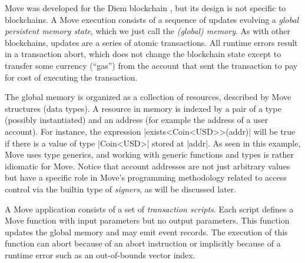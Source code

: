 

Move was developed for the Diem blockchain \cite{DIEM}, but its design is not
specific to blockchains.  A Move execution consists of a sequence of updates
evolving a \emph{global persistent memory state}, which we just call the
\emph{(global) memory}.
As with other blockchains, updates are a series of atomic transactions.
All runtime errors result in a transaction abort, which does not change
the blockchain state except to transfer some currency (``gas'') from the account that
sent the transaction to pay for cost of executing the transaction.

The global memory is organized as a collection of resources, described by Move
structures (data types). A resource in memory is indexed by a pair of a type
(possibly instantiated) and an address (for example the address of a user
account). For instance, the expression |exists<Coin<USD>>(addr)| will be true if
there is a value of type |Coin<USD>| stored at |addr|. As seen in this example,
Move uses type generics, and working with generic functions and types is rather
idiomatic for Move.  Notice that account addresses are not just arbitrary values
but have a specific role in Move's programming methodology related to access
control via the builtin type of \emph{signers}, as will be discussed later.

A Move application consists of a set of \emph{transaction scripts}. Each
script defines a Move function with input parameters but no output
parameters.  This function updates the global memory and may emit
event records. The execution of this function can abort because of an abort
instruction or implicitly because of a runtime error such as an out-of-bounds
vector index.




